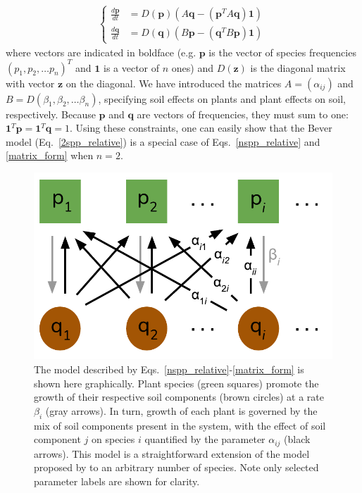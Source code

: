 \documentclass[11pt]{article}
\begin{document}
\begin{align} \label{matrix_form}
\begin{cases}
\frac{d\bm{p}}{dt} &= D(\bm{p}) \left(A \bm{q} - (\bm{p}^T A \bm{q}) \bm{1} \right) \\
\frac{d\bm{q}}{dt} &= D(\bm{q}) \left(B \bm{p} - (\bm{q}^T B \bm{p}) \bm{1}  \right) \,
\end{cases}
\end{align}
where vectors are indicated in boldface (e.g. $\bm{p}$ is the vector of species frequencies $(p_1, p_2, \dots p_n)^T$ and $\bm{1}$ is a vector of $n$ ones) and $D(\bm{z})$ is the diagonal matrix with vector $\bm{z}$ on the diagonal. We have introduced the matrices $A = (\alpha_{ij})$ and $B = D(\beta_1, \beta_2, \dots \beta_n)$, specifying soil effects on plants and plant effects on soil, respectively. Because $\bm{p}$ and $\bm{q}$ are vectors of frequencies, they must sum to one: $\bm{1}^T \bm{p} = \bm{1}^T \bm{q} = 1$. Using these constraints, one can easily show that the Bever model (Eq.~\ref{2spp_relative}) is a special case of Eqs.~\ref{nspp_relative} and \ref{matrix_form} when $n = 2$.

\begin{figure}
	\centering
	\includegraphics[width=\textwidth]{figure_1.pdf}
	\caption[Structure of the $n$-species Bever model]
	{The model described by Eqs.~\ref{nspp_relative}-\ref{matrix_form} is shown here graphically. Plant species (green squares) promote the growth of their respective soil components (brown circles) at a rate $\beta_i$ (gray arrows). In turn, growth of each plant is governed by the mix of soil components present in the system, with the effect of soil component $j$ on species $i$ quantified by the parameter $\alpha_{ij}$ (black arrows). This model is a straightforward extension of the model proposed by \citet{bever1997incorporating} to an arbitrary number of species. Note only selected parameter labels are shown for clarity.}
	\label{fig:concept}
\end{figure}
\end{document}
